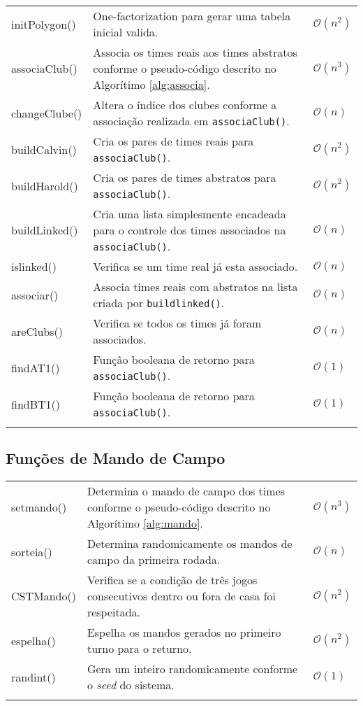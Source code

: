 \documentclass[12pt,a4paper]{article}
\numberwithin{figure}{section}
\numberwithin{table}{section}
\begin{document}
\begin{longtable}{>{\ttfamily}p{3cm} p{11cm} p{1cm}}
	initPolygon() & One-factorization para gerar uma tabela inicial valida. & $\mathcal{O}(n^2)$ \\
	associaClub() & Associa os times reais aos times abstratos conforme o pseudo-código descrito no Algorítimo \ref{alg:associa}. & $\mathcal{O}(n^3)$ \\
	changeClube() & Altera o índice dos clubes conforme a associação realizada em \texttt{associaClub()}. & $\mathcal{O}(n)$ \\
	buildCalvin() & Cria os pares de times reais para \texttt{associaClub()}. & $\mathcal{O}(n^2)$ \\
	buildHarold() & Cria os pares de times abstratos para \texttt{associaClub()}. & $\mathcal{O}(n^2)$ \\
	buildLinked() & Cria uma lista simplesmente encadeada para o controle dos times associados na \texttt{associaClub()}. & $\mathcal{O}(n)$ \\
	islinked() & Verifica se um time real já esta associado. & $\mathcal{O}(n)$ \\
	associar() & Associa times reais com abstratos na lista criada por \texttt{buildlinked()}. & $\mathcal{O}(n)$ \\
	areClubs() & Verifica se todos os times já foram associados. & $\mathcal{O}(n)$ \\
	findAT1() & Função booleana de retorno para \texttt{associaClub()}. & $\mathcal{O}(1)$ \\
	findBT1() & Função booleana de retorno para \texttt{associaClub()}. & $\mathcal{O}(1)$ \\
	\label{tab:s0}
\end{longtable}
\vspace{-0.5cm}

\subsection{Funções de Mando de Campo}

\begin{longtable}{>{\ttfamily}p{3cm} p{11cm} p{1cm}}
	setmando() & Determina o mando de campo dos times conforme o pseudo-código descrito no Algorítimo \ref{alg:mando}. & $\mathcal{O}(n^3)$ \\
	sorteia() & Determina randomicamente os mandos de campo da primeira rodada. & $\mathcal{O}(n)$ \\
	CSTMando() & Verifica se a condição de três jogos consecutivos dentro ou fora de casa foi respeitada. & $\mathcal{O}(n^2)$ \\
	espelha() & Espelha os mandos gerados no primeiro turno para o returno. & $\mathcal{O}(n^2)$ \\
	randint() & Gera um inteiro randomicamente conforme o \textit{seed} do sistema. & $\mathcal{O}(1)$ \\
	\label{tab:mando}
\end{longtable}
\vspace{-0.5cm}
\end{document}

